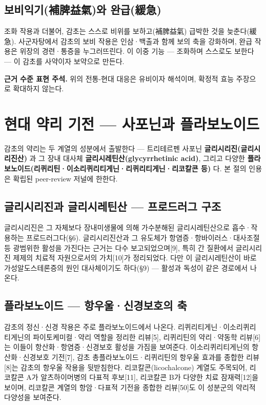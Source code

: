 \documentclass[11pt,oneside]{book}
\newenvironment{authnote}
  {\par\smallskip\begingroup\leftskip=7mm\rightskip=5mm\small\color{muted}\noindent\ignorespaces}
  {\par\endgroup\smallskip}
\begin{document}
\subsection{보비익기(補脾益氣)와 완급(緩急)}
조화 작용과 더불어, 감초는 스스로 비위를 보하고(補脾益氣) 급박한 것을 늦춘다(緩急). 사군자탕에서 감초의 보비 작용은 인삼·백출과 함께 보의 축을 강화하며, 완급 작용은 위장의 경련·통증을 누그러뜨린다. 이 이중 기능 — 조화하며 스스로도 보한다 — 이 감초를 사약이자 보약으로 만든다.

\begin{authnote}\textbf{근거 수준 표현 주석.} 위의 전통-현대 대응은 유비이자 해석이며, 확정적 효능 주장으로 확대하지 않는다.\end{authnote}
\section{현대 약리 기전 — 사포닌과 플라보노이드}
감초의 약리는 두 계열의 성분에서 출발한다 — 트리테르펜 사포닌 \textbf{글리시리진(글리시리진산)} 과 그 장내 대사체 \textbf{글리시레틴산(glycyrrhetinic acid)}, 그리고 다양한 \textbf{플라보노이드(리퀴리틴·이소리퀴리티게닌·리퀴리티게닌·리코칼콘 등)} 다. 본 절의 인용은 확립된 peer-review 저널에 한한다.

\subsection{글리시리진과 글리시레틴산 — 프로드러그 구조}
글리시리진은 그 자체보다 장내미생물에 의해 가수분해된 글리시레틴산으로 흡수·작용하는 프로드러그다(§6). 글리시리진산과 그 유도체가 항염증·항바이러스·대사조절 등 광범위한 활성을 가진다는 근거는 다수 보고되었으며[9], 특히 간 질환에서 글리시리진 제제의 치료적 자원으로서의 가치[10]가 정리되었다. 다만 이 글리시레틴산이 바로 가성알도스테론증의 원인 대사체이기도 하다(§9) — 활성과 독성이 같은 경로에서 나온다.

\subsection{플라보노이드 — 항우울·신경보호의 축}
감초의 정신·신경 작용은 주로 플라보노이드에서 나온다. 리퀴리티게닌·이소리퀴리티게닌의 파이토케미컬·약리 역할을 정리한 리뷰[5], 리퀴리틴의 약리·약동학 리뷰[6]는 이들이 항산화·항염증·신경보호 활성을 가짐을 보여준다. 이소리퀴리티게닌의 항산화·신경보호 기전[7], 감초 총플라보노이드·리퀴리틴의 항우울 효과를 종합한 리뷰[8]는 감초의 항우울 작용을 뒷받침한다. 리코칼콘(licochalcone) 계열도 주목되어, 리코칼콘 A가 알츠하이머병의 다표적 후보[11], 리코칼콘 B가 다양한 치료 잠재력[12]을 보이며, 리코칼콘 계열의 항암·다표적 기전을 종합한 리뷰[50]도 이 성분군의 약리적 다양성을 보여준다.
\end{document}
